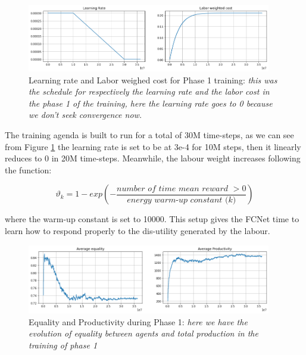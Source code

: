\begin{figure}[h!]
    \centering
    \linespread{.9} 
    \includegraphics[width=0.95\textwidth]{Resources/imgs/LR_phase1.png}
    \caption[Learning rate and Labor weighed cost for Phase 1 training: ]%
    {\label{img:lr_phase0}Learning rate and Labor weighed cost for Phase 1 training: \small \textit{this was the schedule for respectively the learning rate and the labor cost in the phase 1 of the training, here the learning rate goes to 0 because we don't seek convergence now.}}
\end{figure}

The training agenda is built to run for a total of 30M time-steps, as we can see from Figure \ref{img:lr_phase0} the learning rate is set to be at 3e-4 for 10M steps, then it linearly reduces to 0 in 20M time-steps. Meanwhile, the labour weight increases following the function:

\begin{equation}
    \vartheta_k = 1- exp\left(- \frac{\textit{number of time mean reward }> 0}{\textit{energy warm-up constant (k)}}\right)
\end{equation}

where the warm-up constant is set to 10000. This setup gives the FCNet time to learn how to respond properly to the dis-utility generated by the labour. 



\begin{figure}[h!]
    \centering
    \linespread{.9} 
    \includegraphics[width=0.95\textwidth]{Resources/imgs/FCNET_prod_phase1.png}
    \caption[Equality and Productivity during Phase 1:  ]%
    {\label{img:prod_phase0}Equality and Productivity during Phase 1: \small \textit{here we have the evolution of equality between agents and total production in the training of phase 1}}
\end{figure}


